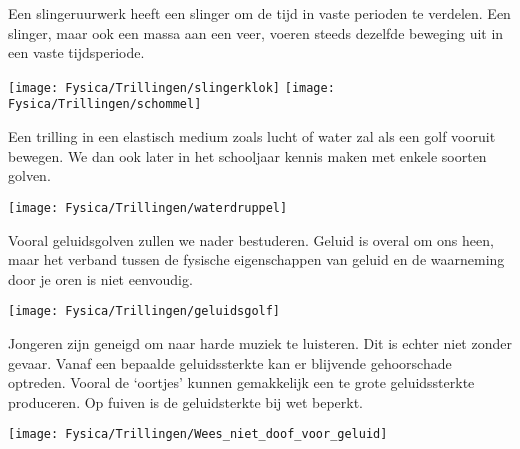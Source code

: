 \documentclass{ximera}
\begin{document}
    \author{Ingmar Herreman}
    \date{Januari 2024}
   
Een slingeruurwerk heeft een slinger om de tijd in vaste perioden te verdelen. Een slinger, maar ook een massa aan een veer, voeren steeds dezelfde beweging uit in een vaste tijdsperiode. 
\begin{center}
    \texttt{[image: Fysica/Trillingen/slingerklok]}
    \texttt{[image: Fysica/Trillingen/schommel]}
\end{center}
Een trilling in een elastisch medium zoals lucht of water zal als een golf vooruit bewegen. 
We dan ook later in het schooljaar kennis maken met enkele soorten golven. 
\begin{center}
    \texttt{[image: Fysica/Trillingen/waterdruppel]}
\end{center}

Vooral geluidsgolven zullen we nader bestuderen. Geluid is overal om ons heen, maar het verband tussen de fysische eigenschappen van geluid en de waarneming door je oren is niet eenvoudig. 
 \begin{center}
    \texttt{[image: Fysica/Trillingen/geluidsgolf]}
\end{center}
Jongeren zijn geneigd om naar harde muziek te luisteren. Dit is echter niet zonder gevaar. Vanaf een bepaalde geluidssterkte kan er blijvende gehoorschade optreden. Vooral de ‘oortjes’ kunnen gemakkelijk een te grote geluidssterkte produceren. Op fuiven is de geluidsterkte bij wet beperkt. 

 \begin{center}
    \texttt{[image: Fysica/Trillingen/Wees\_niet\_doof\_voor\_geluid]}
\end{center}

  
   
    
\end{document}
